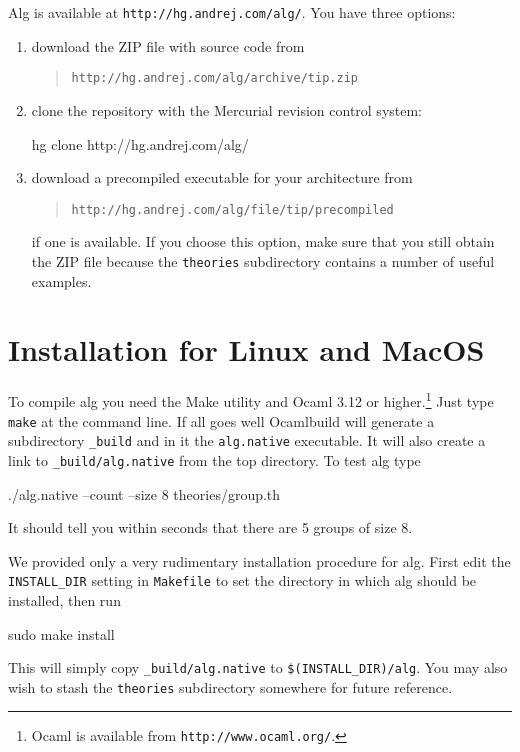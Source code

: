 \documentclass{report}
\begin{document}
Alg is available at \texttt{http://hg.andrej.com/alg/}. You have three
options:
%
\begin{enumerate}
\item download the ZIP file with source code from
  \begin{quote}
    \texttt{http://hg.andrej.com/alg/archive/tip.zip}
  \end{quote}
\item clone the repository with the Mercurial revision control system:
%
\begin{shell}
hg clone http://hg.andrej.com/alg/
\end{shell}
\item download a precompiled executable for your architecture from
  \begin{quote}
    \texttt{http://hg.andrej.com/alg/file/tip/precompiled}
  \end{quote}
  if one is available. If you choose this option, make sure that you
  still obtain the ZIP file because the \texttt{theories} subdirectory
  contains a number of useful examples.
\end{enumerate}

\section{Installation for Linux and MacOS}
\label{sec:comp-under-linux}

To compile alg you need the Make utility and Ocaml 3.12 or
higher.\footnote{Ocaml is available from \texttt{http://www.ocaml.org/}.}
Just type \texttt{make} at the command line. If all goes well
Ocamlbuild will generate a subdirectory \texttt{\_build} and in it the
\texttt{alg.native} executable. It will also create a link to
\texttt{\_build/alg.native} from the top directory. To test alg type
%
\begin{shell}
./alg.native --count --size 8 theories/group.th
\end{shell}
%
It should tell you within seconds that there are 5 groups of size 8. 

We provided only a very rudimentary installation procedure for alg.
First edit the \texttt{INSTALL\_DIR} setting in \texttt{Makefile} to
set the directory in which alg should be installed, then run
%
\begin{shell}
sudo make install
\end{shell}
%
This will simply copy \texttt{\_build/alg.native} to
\texttt{\$(INSTALL\_DIR)/alg}. You may also wish to stash the
\texttt{theories} subdirectory somewhere for future reference.
\end{document}
